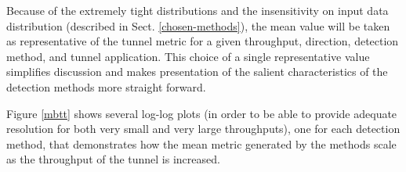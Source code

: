 \documentclass{llncs}
\begin{document}
Because of the extremely tight distributions and the insensitivity on input data
distribution (described in Sect. \ref{chosen-methods}), the mean value will be
taken as representative of the tunnel metric for a given throughput, direction,
detection method, and tunnel application. This choice of a single representative
value simplifies discussion and makes presentation of the salient
characteristics of the detection methods more straight forward.

Figure \ref{mbtt} shows several log-log plots (in order to be able to provide
adequate resolution for both very small and very large throughputs), one for
each detection method, that demonstrates how the mean metric generated by the
methods scale as the throughput of the tunnel is increased.

%
%
%
%
%
\end{document}
